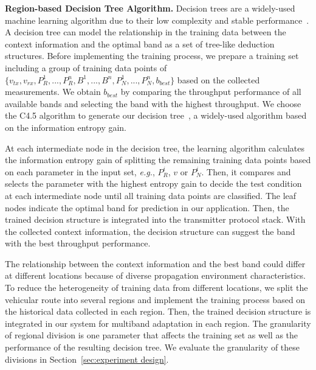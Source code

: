{\bf Region-based Decision Tree Algorithm.} Decision trees are a  
widely-used machine learning 
algorithm due to their low complexity and stable performance~\cite{banfield2007}.
A decision tree can model the relationship in the training data between the context 
information and the optimal band as a set of tree-like deduction structures. Before 
implementing the training process, we prepare a training set including a group of 
training data points of $\{v_{tx}, v_{rx}, P_R^1, ..., P_R^n,  B^1, ..., B^n, P_N^1, 
..., P_N^n, b_{best}\}$ based on the collected measurements. We obtain $b_{best}$ by comparing
the throughput performance of all available bands and selecting the band with the highest 
throughput. We choose the C4.5 algorithm to generate our decision tree~\cite{hall2009weka}, a widely-used algorithm based on the 
information entropy gain. 

At each intermediate
node in the decision tree, the learning algorithm calculates the information entropy 
gain of splitting the remaining training data points based on each parameter in the input 
set, {\it e.g.}, $P_R^i$, $v$ or $P_N^i$. Then, it compares and selects the parameter with 
the highest entropy gain to decide the test condition at each intermediate node until 
all training data points are classified.  The leaf nodes indicate the optimal band for 
prediction in our application. Then, the trained decision structure is integrated into 
the transmitter protocol stack. With the collected context information, the decision 
structure can suggest the band with the best throughput performance. 

The relationship between the context information and the best band could differ at
different locations because of diverse propagation environment characteristics. 
To reduce the heterogeneity of training data from different locations, we split 
the vehicular route into several regions and implement the training process based 
on the historical data collected in each region. Then, the trained decision structure 
is integrated in our system for multiband adaptation in each region. The granularity 
of regional division is one parameter that affects the training set as well as the 
performance of the resulting decision tree. We 
evaluate the granularity of these divisions in Section~\ref{sec:experiment design}.
